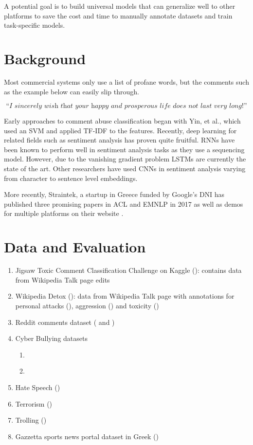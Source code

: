 \documentclass[11pt,letterpaper]{article}
\newcommand{\blue}[1]{\textcolor{RoyalBlue}{#1}}
\newcommand{\instructions}[1]{\blue{\textit{#1}}}
\renewcommand{\instructions}[1]{}
\begin{document}
A potential goal is to build universal models that can generalize well to other platforms to save the cost and time to manually annotate datasets and train task-specific models.

\section*{Background}
\instructions{Has there been any prior work on this task? If so,
  provide references where available}
  Most commercial systems only use a list of profane words, but the comments such as the example below can easily slip through.


    $$\textit{``I sincerely wish that your happy and prosperous life does not last very long!''}$$

Early approaches to comment abuse classification began with Yin, et al., which used an SVM and applied TF-IDF to the features. Recently, deep learning for related fields such as sentiment analysis has proven quite fruitful. RNNs have been known to perform well in sentiment analysis tasks as they use a sequencing model.  However, due to the vanishing gradient problem LSTMs are currently the state of the art. Other researchers have used CNNs in sentiment analysis varying from character to sentence level embeddings.

More recently, Straintek, a startup in Greece funded by Google’s DNI has published three promising papers in ACL and EMNLP in 2017 as well as demos for multiple platforms on their website \cite{demo} .

\section*{Data and Evaluation}
\instructions{Do you have data to train and test your system on? How
  will you evaluate your system?}

  \begin{enumerate}
  \item Jigsaw Toxic Comment Classification Challenge on Kaggle (\cite{kaggle}): contains data from Wikipedia Talk page edits
  \item Wikipedia Detox (\cite{wikidetoxdatarelease}): data from Wikipedia Talk page with annotations for personal attacks (\cite{wikidetoxpersonalattacks}), aggression (\cite{wikidetoxaggression}) and toxicity (\cite{wikidetoxtoxicity})
  \item Reddit comments dataset (\cite{redditdata1} and \cite{redditdata2})
  \item Cyber Bullying datasets
    \begin{enumerate}
    \item \cite{cyberbull1}
    \item \cite{cyberbull2}
    \end{enumerate}
  \item Hate Speech (\cite{hateoffensive})
  \item Terrorism (\cite{terrorism})
  \item Trolling (\cite{trolololo})
  \item Gazzetta sports news portal dataset in Greek (\cite{greekdataset})
  \end{enumerate}
\end{document}
